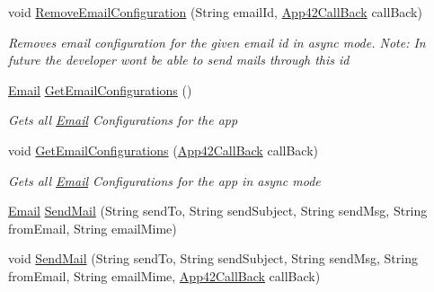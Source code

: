 \begin{DoxyCompactItemize}
void \hyperlink{classcom_1_1shephertz_1_1app42_1_1paas_1_1sdk_1_1csharp_1_1email_1_1_email_service_a36131a6e28d0dc509a5f949fda8cc53f}{Remove\+Email\+Configuration} (String email\+Id, \hyperlink{interfacecom_1_1shephertz_1_1app42_1_1paas_1_1sdk_1_1csharp_1_1_app42_call_back}{App42\+Call\+Back} call\+Back)
\begin{DoxyCompactList}\small\item\em Removes email configuration for the given email id in async mode. Note\+: In future the developer wont be able to send mails through this id \end{DoxyCompactList}\item 
\hyperlink{classcom_1_1shephertz_1_1app42_1_1paas_1_1sdk_1_1csharp_1_1email_1_1_email}{Email} \hyperlink{classcom_1_1shephertz_1_1app42_1_1paas_1_1sdk_1_1csharp_1_1email_1_1_email_service_a226628a1ae9354de7fcffed6bfc435ac}{Get\+Email\+Configurations} ()
\begin{DoxyCompactList}\small\item\em Gets all \hyperlink{classcom_1_1shephertz_1_1app42_1_1paas_1_1sdk_1_1csharp_1_1email_1_1_email}{Email} Configurations for the app \end{DoxyCompactList}\item 
void \hyperlink{classcom_1_1shephertz_1_1app42_1_1paas_1_1sdk_1_1csharp_1_1email_1_1_email_service_a04d6fa793827e3142c5f0114e643fad8}{Get\+Email\+Configurations} (\hyperlink{interfacecom_1_1shephertz_1_1app42_1_1paas_1_1sdk_1_1csharp_1_1_app42_call_back}{App42\+Call\+Back} call\+Back)
\begin{DoxyCompactList}\small\item\em Gets all \hyperlink{classcom_1_1shephertz_1_1app42_1_1paas_1_1sdk_1_1csharp_1_1email_1_1_email}{Email} Configurations for the app in async mode \end{DoxyCompactList}\item 
\hyperlink{classcom_1_1shephertz_1_1app42_1_1paas_1_1sdk_1_1csharp_1_1email_1_1_email}{Email} \hyperlink{classcom_1_1shephertz_1_1app42_1_1paas_1_1sdk_1_1csharp_1_1email_1_1_email_service_a9098ffb7e2ff550f15854ac95ddb1c2e}{Send\+Mail} (String send\+To, String send\+Subject, String send\+Msg, String from\+Email, String email\+Mime)
\item 
void \hyperlink{classcom_1_1shephertz_1_1app42_1_1paas_1_1sdk_1_1csharp_1_1email_1_1_email_service_a520622031b39e6ba41931635a9584f79}{Send\+Mail} (String send\+To, String send\+Subject, String send\+Msg, String from\+Email, String email\+Mime, \hyperlink{interfacecom_1_1shephertz_1_1app42_1_1paas_1_1sdk_1_1csharp_1_1_app42_call_back}{App42\+Call\+Back} call\+Back)
\end{DoxyCompactItemize}
